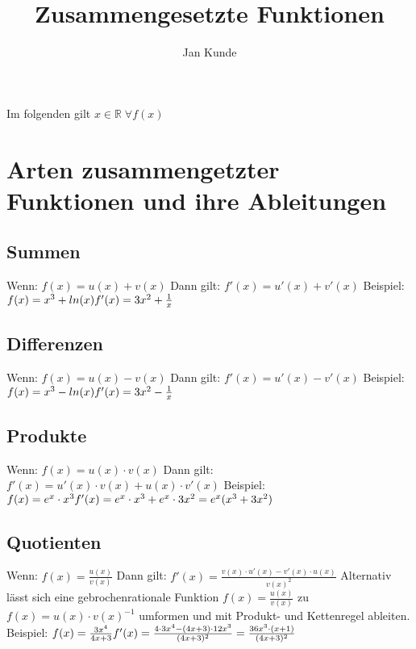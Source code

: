 \documentclass{article}
\title{Zusammengesetzte Funktionen}
\author{Jan Kunde}
\date{}
\begin{document}
\maketitle
\begin{center}
    Im folgenden gilt $ { x \in \mathbb{R} \; \forall f(x)} $
\end{center}
\raggedright
\section*{Arten zusammengetzter Funktionen und ihre Ableitungen}
    \subsection*{Summen}
        Wenn: \break
        $f(x) = u(x) + v(x)$
        \break
        Dann gilt:\break
        $f'(x) = u'(x) + v'(x)$
        \break \break        
        Beispiel: \break \break
        $f(x) = x^3 + ln(x) \break f'(x) = 3x^2+\frac{1}{x}$

    \subsection*{Differenzen}
    Wenn: \break
    $f(x) = u(x) - v(x)$
    \break
    Dann gilt:\break
    $f'(x) = u'(x) - v'(x)$
    \break \break
    Beispiel: \break \break
    $f(x) = x^3 - ln(x) \break f'(x) = 3x^2 - \frac{1}{x}$

    \pagebreak
    
    \subsection*{Produkte}
    Wenn: \break
    $f(x) = u(x) \cdot v(x)$
    \break
    Dann gilt:\break
    $f'(x) = u'(x) \cdot v(x) + u(x) \cdot v'(x)$
    \break \break
    Beispiel: \break \break
    $f(x) = e^x \cdot x^3 \break
    f'(x) = e^x \cdot x^3 + e^x \cdot 3x^2 = e^x(x^3+3x^2)$
    


    \subsection*{Quotienten}
    Wenn: \break
    $f(x) = \frac{u(x)}{v(x)}$
    \break
    Dann gilt: \break
    $f'(x) = \frac{v(x)\cdot u'(x) - v'(x) \cdot u(x)}{v(x)^2}$
    Alternativ lässt sich eine gebrochenrationale Funktion 
    $f(x) = \frac{u(x)}{v(x)}$ zu $f(x) = u(x) \cdot v(x)^{-1}$
    umformen und mit Produkt- und Kettenregel ableiten.
    \break \break
    Beispiel: \break \break
    $f(x) = \frac{3x^4}{4x+3}\break f'(x) = \frac{4\cdot 3x^4 - (4x+3) \cdot 12x^3}{(4x+3)^2} = \frac{36x^3\cdot (x+1)}{(4x+3)^2}$
\end{document}
